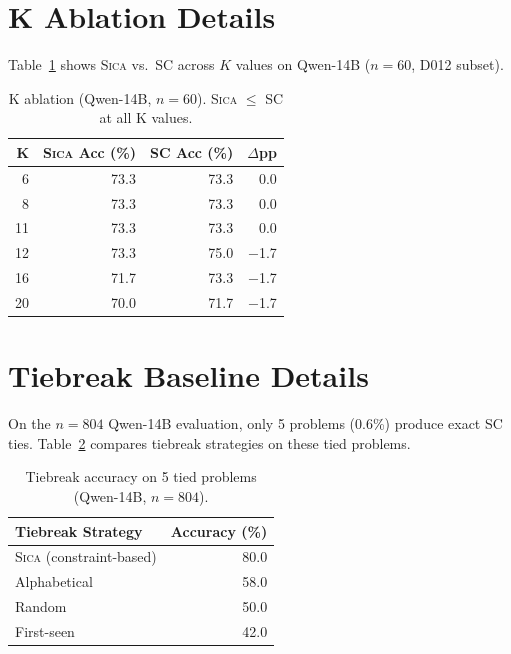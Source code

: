 \documentclass[11pt,a4paper]{article}
\newcommand{\sica}{\textsc{Sica}}
\begin{document}
\appendix
\section{K Ablation Details}
\label{app:k_ablation}

Table~\ref{tab:k_ablation} shows \sica{} vs.\ SC across $K$ values on Qwen-14B ($n=60$, D012 subset).

\begin{table}[h]
\centering
\caption{K ablation (Qwen-14B, $n=60$). \sica{} $\leq$ SC at all K values.}
\label{tab:k_ablation}
\small
\begin{tabular}{rrrr}
\toprule
\textbf{K} & \textbf{\sica{} Acc (\%)} & \textbf{SC Acc (\%)} & \textbf{$\Delta$pp} \\
\midrule
6 & 73.3 & 73.3 & 0.0 \\
8 & 73.3 & 73.3 & 0.0 \\
11 & 73.3 & 73.3 & 0.0 \\
12 & 73.3 & 75.0 & $-$1.7 \\
16 & 71.7 & 73.3 & $-$1.7 \\
20 & 70.0 & 71.7 & $-$1.7 \\
\bottomrule
\end{tabular}
\end{table}

\section{Tiebreak Baseline Details}
\label{app:tiebreak}

On the $n=804$ Qwen-14B evaluation, only 5 problems (0.6\%) produce exact SC ties.
Table~\ref{tab:tiebreak} compares tiebreak strategies on these tied problems.

\begin{table}[h]
\centering
\caption{Tiebreak accuracy on 5 tied problems (Qwen-14B, $n=804$).}
\label{tab:tiebreak}
\small
\begin{tabular}{lr}
\toprule
\textbf{Tiebreak Strategy} & \textbf{Accuracy (\%)} \\
\midrule
\sica{} (constraint-based) & 80.0 \\
Alphabetical & 58.0 \\
Random & 50.0 \\
First-seen & 42.0 \\
\bottomrule
\end{tabular}
\end{table}
\end{document}
